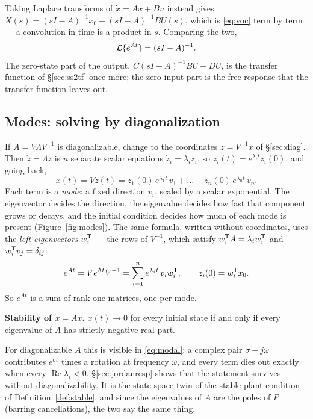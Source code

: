 \documentclass[11pt]{article}
\begin{document}
Taking Laplace transforms of $\dot x=Ax+Bu$ instead gives
$X(s)=(sI-A)^{-1}x_0+(sI-A)^{-1}BU(s)$, which is \eqref{eq:voc} term by term
--- a convolution in time is a product in $s$. Comparing the two,
\begin{equation}\label{eq:laplaceexpm}
   \mathcal{L}\{e^{At}\} = (sI-A)^{-1}.
\end{equation}
The zero-state part of the output, $C(sI-A)^{-1}BU+DU$, is the transfer function of
\S\ref{sec:ss2tf} once more; the zero-input part is the free response that the
transfer function leaves out.

\subsection{Modes: solving by diagonalization}\label{sec:modes}
If $A=V\Lambda V^{-1}$ is diagonalizable, change to the coordinates
$z=V^{-1}x$ of \S\ref{sec:diag}. Then $\dot z=\Lambda z$ is $n$ separate scalar
equations $\dot z_i=\lambda_iz_i$, so $z_i(t)=e^{\lambda_it}z_i(0)$, and going back,
\begin{equation}\label{eq:modal}
   x(t) = Vz(t) = z_1(0)\,e^{\lambda_1t}\,v_1 + \dots + z_n(0)\,e^{\lambda_nt}\,v_n .
\end{equation}
Each term is a \emph{mode}: a fixed direction $v_i$, scaled by a scalar exponential.
The eigenvector decides the direction, the eigenvalue decides how fast that
component grows or decays, and the initial condition decides how much of each mode
is present (Figure~\ref{fig:modes}). The same formula, written without coordinates,
uses the \emph{left eigenvectors} $w_i^{\mathsf{T}}$ --- the rows of $V^{-1}$, which satisfy
$w_i^{\mathsf{T}} A=\lambda_iw_i^{\mathsf{T}}$ and $w_i^{\mathsf{T}} v_j=\delta_{ij}$:
\begin{equation}\label{eq:expmdyad}
   e^{At} = Ve^{\Lambda t}V^{-1} = \sum_{i=1}^{n} e^{\lambda_it}\,v_iw_i^{\mathsf{T}} ,
   \qquad z_i(0) = w_i^{\mathsf{T}} x_0 .
\end{equation}
So $e^{At}$ is a sum of rank-one matrices, one per mode.

\begin{keybox}
\textbf{Stability of $\dot x=Ax$.} $x(t)\to0$ for every initial state if and only
if every eigenvalue of $A$ has strictly negative real part.
\end{keybox}
For diagonalizable $A$ this is visible in \eqref{eq:modal}: a complex pair
$\sigma\pm j\omega$ contributes $e^{\sigma t}$ times a rotation at frequency
$\omega$, and every term dies out exactly when every $\operatorname{Re}\lambda_i<0$.
\S\ref{sec:jordanresp} shows that the statement survives without
diagonalizability. It is the state-space twin of the stable-plant condition of
Definition~\ref{def:stable}, and since the eigenvalues of $A$ are the poles of $P$
(barring cancellations), the two say the same thing.
\end{document}
